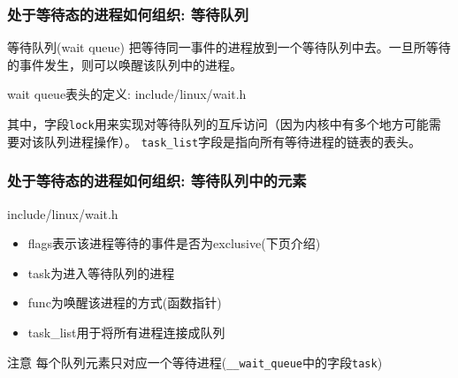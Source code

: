\documentclass[xcolor=svgnames]{beamer}
\begin{document}
\begin{CJK*}{UTF8}{gbsn}
\begin{frame}[fragile]
\frametitle{处于等待态的进程如何组织: 等待队列}
\begin{block}{等待队列(wait queue)}
把等待同一事件的进程放到一个等待队列中去。一旦所等待的事件发生，则可以唤醒该队列中的进程。
\end{block}
\begin{block}{wait queue表头的定义: include/linux/wait.h}
\lstwaitqueuehead
\end{block}
其中，字段\verb|lock|用来实现对等待队列的互斥访问（因为内核中有多个地方可能需要对该队列进程操作）。
\verb|task_list|字段是指向所有等待进程的链表的表头。
\end{frame}


\begin{frame}[fragile]
\frametitle{处于等待态的进程如何组织: 等待队列中的元素}
\begin{block}{include/linux/wait.h}
\lstwaitqueue
\end{block}
\begin{itemize}
\item flags表示该进程等待的事件是否为exclusive(下页介绍)
\item task为进入等待队列的进程
\item func为唤醒该进程的方式(函数指针)
\item task\_list用于将所有进程连接成队列
\end{itemize}
\begin{block}{注意}
每个队列元素只对应一个等待进程(\verb|__wait_queue|中的字段\verb|task|)
\end{block}
\end{frame}


\end{CJK*}
\end{document}
